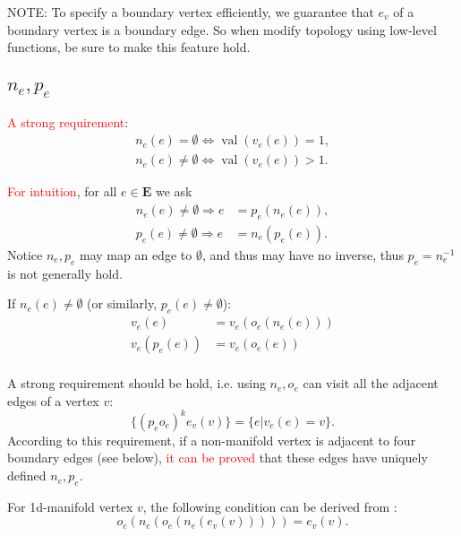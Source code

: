 \documentclass[9pt,twocolumn]{extarticle}
\newcommand{\TODO}[1]{\textcolor{red}{#1}}
\newcommand{\SET}[1]{\mathbf{#1}}
\DeclareMathOperator{\VAL}{val}
\begin{document}
NOTE: To specify a boundary vertex efficiently, we guarantee that $e_v$ of a boundary vertex is a boundary edge. So when modify topology using low-level functions, be sure to make this feature hold.

\subsection{$n_e,p_e$}
\TODO{A strong requirement}:
\begin{equation}
  \begin{split}
    n_e(e) = \emptyset \Leftrightarrow \VAL(v_e(e)) = 1,\\
    n_e(e) \neq \emptyset \Leftrightarrow \VAL(v_e(e)) > 1.
  \end{split}
  \label{eq:val_n}
\end{equation}

\TODO{For intuition}, for all $e \in \SET{E}$ we ask
\begin{equation}
  \begin{split}
    n_e(e) \neq \emptyset \Rightarrow e &= p_e(n_e(e)),\\
    p_e(e) \neq \emptyset \Rightarrow e &= n_e(p_e(e)).
  \end{split}
  \label{eq:np_e}
\end{equation}
Notice $n_e,p_e$ may map an edge to $\emptyset$, and thus may have no
inverse, thus $p_e = n_e^{-1}$ is not generally hold.

If $n_e(e) \neq \emptyset$ (or similarly, $p_e(e) \neq \emptyset$):
\begin{equation}
  \begin{split}
    v_e(e) &= v_e(o_e(n_e(e)))\\
    v_e(p_e(e)) &= v_e(o_e(e))\\
  \end{split}
\end{equation}

A strong requirement should be hold, i.e. using $n_e, o_e$ can visit all the adjacent edges of a vertex $v$:
\begin{equation}
  \{(p_eo_e)^ke_v(v)\} = \{e|v_e(e) = v\}.
\end{equation}
According to this requirement, if a non-manifold vertex is adjacent to
four boundary edges (see below), \TODO{it can be proved} that these
edges have uniquely defined $n_e,p_e$.


For 1d-manifold vertex $v$, the following condition can be derived
from :
\begin{equation}
  o_e(n_e(o_e(n_e(e_v(v))))) = e_v(v).
  \label{eq:1d-manifold}
\end{equation}
\end{document}
